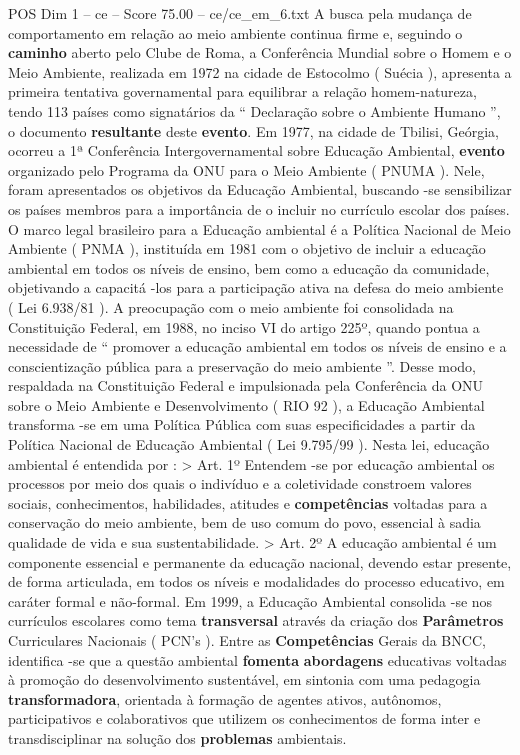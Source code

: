 \begin{textsample}{POS Dim 1 – ce – Score 75.00 – ce/ce\_em\_6.txt}
A busca pela mudança de comportamento em relação ao meio ambiente continua firme e, seguindo o \textbf{caminho} aberto pelo Clube de Roma, a Conferência Mundial sobre o Homem e o Meio Ambiente, realizada em 1972 na cidade de Estocolmo ( Suécia ), apresenta a primeira tentativa governamental para equilibrar a relação homem-natureza, tendo 113 países como signatários da “ Declaração sobre o Ambiente Humano ”, o documento \textbf{resultante} deste \textbf{evento}.
Em 1977, na cidade de Tbilisi, Geórgia, ocorreu a 1ª Conferência Intergovernamental sobre Educação Ambiental, \textbf{evento} organizado pelo Programa da ONU para o Meio Ambiente ( PNUMA ).
Nele, foram apresentados os objetivos da Educação Ambiental, buscando -se sensibilizar os países membros para a importância de o incluir no currículo escolar dos países.
O marco legal brasileiro para a Educação ambiental é a Política Nacional de Meio Ambiente ( PNMA ), instituída em 1981 com o objetivo de incluir a educação ambiental em todos os níveis de ensino, bem como a educação da comunidade, objetivando a capacitá -los para a participação ativa na defesa do meio ambiente ( Lei 6.938/81 ).
A preocupação com o meio ambiente foi consolidada na Constituição Federal, em 1988, no inciso VI do artigo 225º, quando pontua a necessidade de “ promover a educação ambiental em todos os níveis de ensino e a conscientização pública para a preservação do meio ambiente ”.
Desse modo, respaldada na Constituição Federal e impulsionada pela Conferência da ONU sobre o Meio Ambiente e Desenvolvimento ( RIO 92 ), a Educação Ambiental transforma -se em uma Política Pública com suas especificidades a partir da Política Nacional de Educação Ambiental ( Lei 9.795/99 ).
Nesta lei, educação ambiental é entendida por : > Art. 1º Entendem -se por educação ambiental os processos por meio dos quais o indivíduo e a coletividade constroem valores sociais, conhecimentos, habilidades, atitudes e \textbf{competências} voltadas para a conservação do meio ambiente, bem de uso comum do povo, essencial à sadia qualidade de vida e sua sustentabilidade. > Art. 2º A educação ambiental é um componente essencial e permanente da educação nacional, devendo estar presente, de forma articulada, em todos os níveis e modalidades do processo educativo, em caráter formal e não-formal.
Em 1999, a Educação Ambiental consolida -se nos currículos escolares como tema \textbf{transversal} através da criação dos \textbf{Parâmetros} Curriculares Nacionais ( PCN’s ).
Entre as \textbf{Competências} Gerais da BNCC, identifica -se que a questão ambiental \textbf{fomenta} \textbf{abordagens} educativas voltadas à promoção do desenvolvimento sustentável, em sintonia com uma pedagogia \textbf{transformadora}, orientada à formação de agentes ativos, autônomos, participativos e colaborativos que utilizem os conhecimentos de forma inter e transdisciplinar na solução dos \textbf{problemas} ambientais.

\end{textsample}
